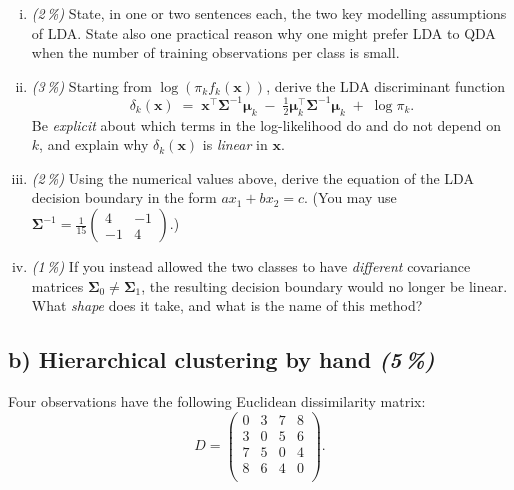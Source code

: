 \documentclass[11pt,a4paper]{article}
\newcommand{\subpoints}[1]{\textit{(#1\,\%)}}
\begin{document}
\begin{enumerate}[(i)]
  \item \subpoints{2} State, in one or two sentences each, the two key modelling assumptions of LDA. State also one practical reason why one might prefer LDA to QDA when the number of training observations per class is small.
  \item \subpoints{3} Starting from $\log(\pi_k f_k(\mathbf{x}))$, derive the LDA discriminant function
    $$\delta_k(\mathbf{x}) \;=\; \mathbf{x}^\top \boldsymbol\Sigma^{-1}\boldsymbol\mu_k \;-\; \tfrac{1}{2}\boldsymbol\mu_k^\top \boldsymbol\Sigma^{-1}\boldsymbol\mu_k \;+\; \log\pi_k.$$
    Be \emph{explicit} about which terms in the log-likelihood do and do not depend on $k$, and explain why $\delta_k(\mathbf{x})$ is \emph{linear} in $\mathbf{x}$.
  \item \subpoints{2} Using the numerical values above, derive the equation of the LDA decision boundary in the form $a x_1 + b x_2 = c$. (You may use $\boldsymbol\Sigma^{-1} = \frac{1}{15}\begin{pmatrix}4 & -1\\-1 & 4\end{pmatrix}$.)
  \item \subpoints{1} If you instead allowed the two classes to have \emph{different} covariance matrices $\boldsymbol\Sigma_0 \neq \boldsymbol\Sigma_1$, the resulting decision boundary would no longer be linear. What \emph{shape} does it take, and what is the name of this method?
\end{enumerate}

\subsection*{b) Hierarchical clustering by hand \subpoints{5}}

Four observations have the following Euclidean dissimilarity matrix:
$$D = \begin{pmatrix}
0 & 3 & 7 & 8 \\
3 & 0 & 5 & 6 \\
7 & 5 & 0 & 4 \\
8 & 6 & 4 & 0 \\
\end{pmatrix}.$$
\end{document}
